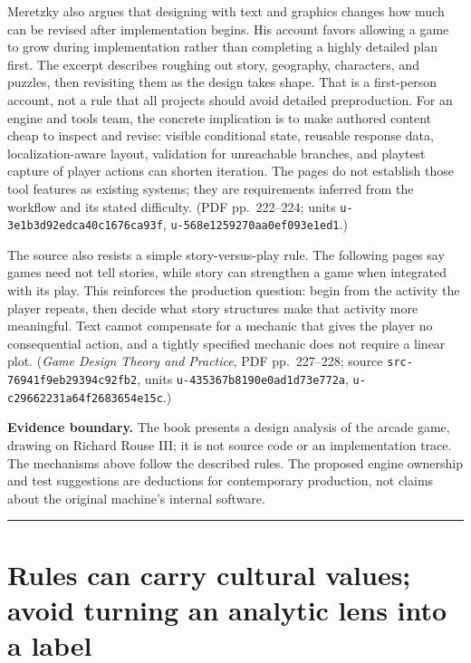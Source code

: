 Meretzky also argues that designing with text and graphics changes how much can be revised after implementation begins. His account favors allowing a game to grow during implementation rather than completing a highly detailed plan first. The excerpt describes roughing out story, geography, characters, and puzzles, then revisiting them as the design takes shape. That is a first-person account, not a rule that all projects should avoid detailed preproduction. For an engine and tools team, the concrete implication is to make authored content cheap to inspect and revise: visible conditional state, reusable response data, localization-aware layout, validation for unreachable branches, and playtest capture of player actions can shorten iteration. The pages do not establish those tool features as existing systems; they are requirements inferred from the workflow and its stated difficulty. (PDF pp.~222--224; units \texttt{u-3e1b3d92edca40c1676ca93f}, \texttt{u-568e1259270aa0ef093e1ed1}.)

The source also resists a simple story-versus-play rule. The following pages say games need not tell stories, while story can strengthen a game when integrated with its play. This reinforces the production question: begin from the activity the player repeats, then decide what story structures make that activity more meaningful. Text cannot compensate for a mechanic that gives the player no consequential action, and a tightly specified mechanic does not require a linear plot. (\emph{Game Design Theory and Practice}, PDF pp.~227--228; source \texttt{src-76941f9eb29394c92fb2}, units \texttt{u-435367b8190e0ad1d73e772a}, \texttt{u-c29662231a64f2683654e15c}.)

\textbf{Evidence boundary.} The book presents a design analysis of the arcade game, drawing on Richard Rouse III; it is not source code or an implementation trace. The mechanisms above follow the described rules. The proposed engine ownership and test suggestions are deductions for contemporary production, not claims about the original machine's internal software.

\begin{center}\rule{0.5\linewidth}{0.5pt}\end{center}

\section{Rules can carry cultural values; avoid turning an analytic lens into a label}\label{06-engine-ii-ch046-rules-can-carry-cultural-values-avoid-turning-an-analytic-lens-into-a-label}

